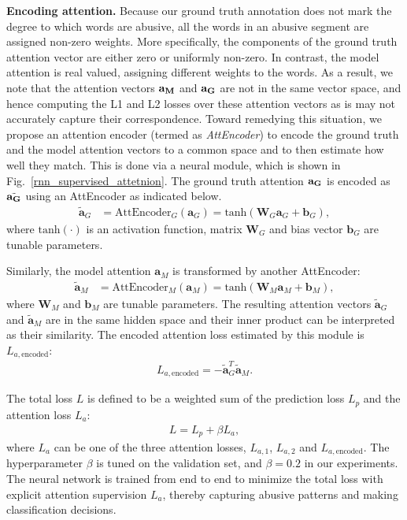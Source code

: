 \documentclass[letterpaper]{article}
\begin{document}
\noindent\textbf{Encoding attention.}
Because our ground truth annotation  does not mark the degree to which words are abusive, all the words in an abusive segment are assigned non-zero weights. More specifically, the components of the ground truth attention vector are either zero or uniformly non-zero.
In contrast, the model attention is real valued, assigning different weights to the words.
As a result, we note that the attention vectors  $\bf{a}_{M}$ and $\bf{a}_{G}$ are not in the same vector space, and hence computing the L1 and L2 losses over these attention vectors as is may not accurately capture their correspondence. Toward remedying this situation, we propose an attention encoder (termed as \textit{AttEncoder}) to encode the ground truth and the model attention vectors to a common space and to then estimate how well they match. This is done via a neural module, which is shown in Fig.~\ref{rnn_supervised_attetnion}.
The ground truth attention $\bf{a}_{G}$ is encoded as $\tilde{\bf{a}_{G}}$ using an AttEncoder as indicated below.
\begin{align}
\tilde{\mathbf{a}}_{G} &= \text{AttEncoder}_{G}(\mathbf{a}_{G})
= \text{tanh}(\mathbf{W}_{G}\mathbf{a}_{G} + \mathbf{b}_{G}),
\label{eq:proj_ground_attention}
\end{align}
where $\text{tanh}(\cdot)$ is an activation function, matrix $\mathbf{W}_{G}$ and bias vector $\mathbf{b}_{G}$ are tunable parameters.

Similarly, the model attention $\mathbf{a}_{M}$ is transformed by another AttEncoder:
\begin{align}
\label{eq:proj_model_attention}
\tilde{\mathbf{a}}_{M} &= \text{AttEncoder}_{M}(\mathbf{a}_{M})
= \text{tanh}(\mathbf{W}_{M}\mathbf{a}_{M} + \mathbf{b}_{M}),
\end{align}
where $\mathbf{W}_{M}$ and $\mathbf{b}_{M}$ are tunable parameters.
The resulting attention vectors $\tilde{\mathbf{a}}_{G}$ and $\tilde{\mathbf{a}}_{M}$ are in the same hidden space and their inner product can be interpreted as their similarity. The encoded attention loss estimated by this  module is $L_{a,\text{encoded}}$:
\begin{align}
L_{a,\text{encoded}} = -\tilde{\mathbf{a}}_{G}^{T}\tilde{\mathbf{a}}_{M}.
\end{align}


The total loss $L$ is defined to be a weighted sum of the prediction loss $L_p$ and the attention loss $L_a$:
\begin{align}
L = L_{p} + \beta L_{a},
\end{align}
{where $L_{a}$ can be one of the three attention losses, $L_{a,1}$, $L_{a,2}$ and $L_{a,\text{encoded}}$.}
The hyperparameter $\beta$ is tuned on the validation set, and $\beta=0.2$ in our experiments. The neural network is trained  from end to end to minimize the total loss with explicit attention supervision $L_{a}$, thereby capturing abusive patterns and making classification decisions.
\end{document}
